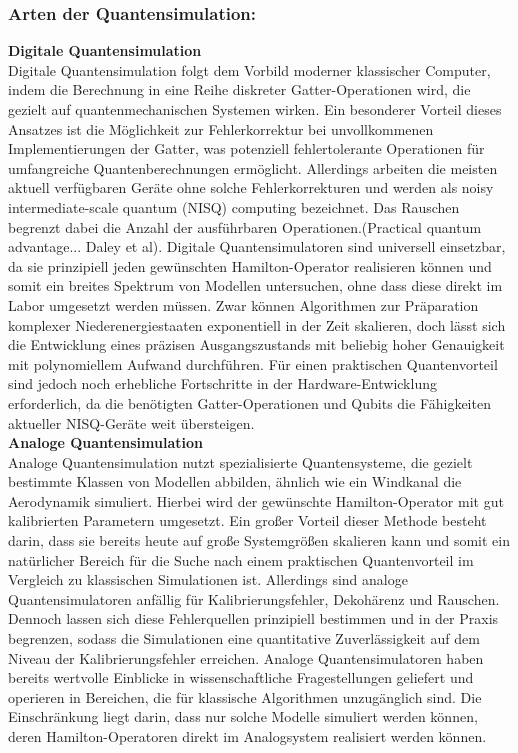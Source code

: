 \subsubsection{Arten der Quantensimulation:}
\textbf{Digitale Quantensimulation} \\
Digitale Quantensimulation folgt dem Vorbild moderner klassischer Computer, indem die Berechnung in eine Reihe diskreter \glqq Gatter\grqq-Operationen wird, die gezielt auf quantenmechanischen Systemen wirken. Ein besonderer Vorteil dieses Ansatzes ist die Möglichkeit zur Fehlerkorrektur bei unvollkommenen Implementierungen der Gatter, was potenziell fehlertolerante Operationen für umfangreiche Quantenberechnungen ermöglicht. Allerdings arbeiten die meisten aktuell verfügbaren Geräte ohne solche Fehlerkorrekturen und werden als \glqq noisy intermediate-scale quantum (NISQ) computing\grqq{} bezeichnet.
 Das Rauschen begrenzt dabei die Anzahl der ausführbaren Operationen.(Practical quantum advantage... Daley et al). Digitale Quantensimulatoren sind universell einsetzbar, da sie prinzipiell jeden gewünschten Hamilton-Operator realisieren können und somit ein breites Spektrum von Modellen untersuchen, ohne dass diese direkt im Labor umgesetzt werden müssen. Zwar können Algorithmen zur Präparation komplexer Niederenergiestaaten exponentiell in der Zeit skalieren, doch lässt sich die Entwicklung eines präzisen Ausgangszustands mit beliebig hoher Genauigkeit mit polynomiellem Aufwand durchführen. Für einen praktischen Quantenvorteil sind jedoch noch erhebliche Fortschritte in der Hardware-Entwicklung erforderlich, da die benötigten Gatter-Operationen und Qubits die Fähigkeiten aktueller NISQ-Geräte weit übersteigen.\\
\textbf{Analoge Quantensimulation}\\ 
Analoge Quantensimulation nutzt spezialisierte Quantensysteme, die gezielt bestimmte Klassen von Modellen abbilden, ähnlich wie ein Windkanal die Aerodynamik simuliert. Hierbei wird der gewünschte Hamilton-Operator mit gut kalibrierten Parametern umgesetzt. Ein großer Vorteil dieser Methode besteht darin, dass sie bereits heute auf große Systemgrößen skalieren kann und somit ein natürlicher Bereich für die Suche nach einem praktischen Quantenvorteil im Vergleich zu klassischen Simulationen ist. Allerdings sind analoge Quantensimulatoren anfällig für Kalibrierungsfehler, Dekohärenz und Rauschen. Dennoch lassen sich diese Fehlerquellen prinzipiell bestimmen und in der Praxis begrenzen, sodass die Simulationen eine quantitative Zuverlässigkeit auf dem Niveau der Kalibrierungsfehler erreichen. Analoge Quantensimulatoren haben bereits wertvolle Einblicke in wissenschaftliche Fragestellungen geliefert und operieren in Bereichen, die für klassische Algorithmen unzugänglich sind. Die Einschränkung liegt darin, dass nur solche Modelle simuliert werden können, deren Hamilton-Operatoren direkt im Analogsystem realisiert werden können.\\


